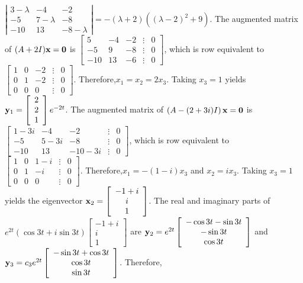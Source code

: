 \documentclass[dvips]{book}
\renewcommand{\exer}[1]{\par\medskip\;\noindent{\color{red}\bf #1.}}
\numberwithin{example}{section}
\numberwithin{equation}{section}
\numberwithin{theorem}{section}
\numberwithin{table}{section}
\numberwithin{figure}{section}
\newcommand{\threecol}[3]{\left[\begin{array}{r}#1\\#2\\#3\end{array}\right]}
\begin{document}
\exer{10.6.14}
$\left|\begin{array}{ccc}3-\lambda&-4&-2\\-5&7-\lambda&-8\\-10
&13&-8-\lambda\end{array}\right|=-(\lambda+2)\left((\lambda-2)^2+9\right)$.
 The augmented matrix of $(A+2I){\bf x=0}$ is
$\left[\begin{array}{rrrcr}5&-4&-2&\vdots&0\\-5&9&-8&\vdots&0\\
-10&13&-6&\vdots&0\end{array}\right]$,
which is row equivalent to
$\left[\begin{array}{rrrcr} 1&0&-2&\vdots&0\\ 0&1&-2&
\vdots&0\\ 0&0&0&\vdots&0\end{array}\right]$.
Therefore,$x_1=x_2=2x_3$.  Taking $x_3=1$ yields
${\bf y}_1=\threecol221e^{-2t}$.
The augmented matrix of
$\left(A-(2+3i)I\right){\bf x=0}$ is
$\left[\begin{array}{ccccr}1-3i&-4&-2&\vdots&0\\-5&5-3i&-8&\vdots&0\\
-10&13&-10-3i&\vdots&0\end{array}\right]$,
which is row equivalent to
$\left[\begin{array}{ccccc} 1&0&1-i&\vdots&0\\
0&1&-i&\vdots&0\\ 0&0&0&\vdots&0\end{array}\right]$.
Therefore,$x_1=-(1-i)x_3$ and $x_2=ix_3$.
Taking $x_3=1$ yields the eigenvector
${\bf x}_2=\left[\begin{array}{c}-1+i\\i\\1\end{array}\right]$.
The real and imaginary parts of $e^{2t}(\cos3t+i\sin3t)
\left[\begin{array}{c}-1+i\\i\\1\end{array}\right]$ are
${\bf y}_2=e^{2t}\left[\begin{array}{c}-\cos3t-\sin3t\\-\sin3t\\
\cos3t\end{array}\right]$ and ${\bf y}_3=
c_3e^{2t}\left[\begin{array}{c}-\sin3t+\cos3t\\\cos3t\\
\sin3t\end{array}\right]$. Therefore,
\end{document}
